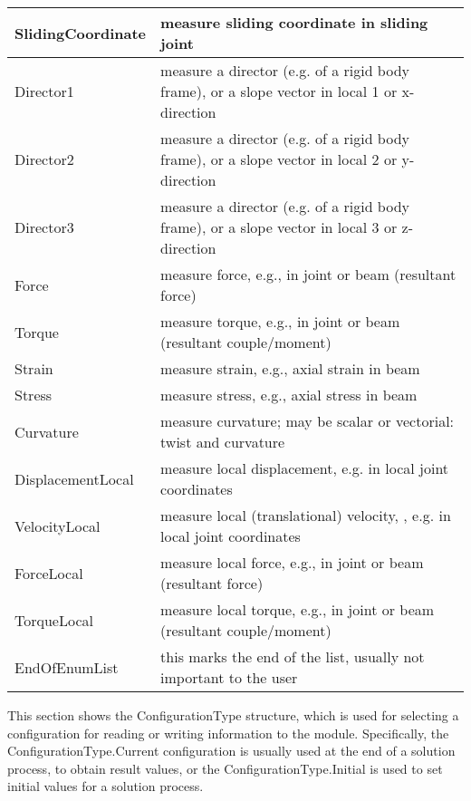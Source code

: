 \begin{center}
\begin{longtable}{| p{8cm} | p{8cm} |}
  SlidingCoordinate & measure sliding coordinate in sliding joint\\ \hline 
  Director1 & measure a director (e.g. of a rigid body frame), or a slope vector in local 1 or x-direction\\ \hline 
  Director2 & measure a director (e.g. of a rigid body frame), or a slope vector in local 2 or y-direction\\ \hline 
  Director3 & measure a director (e.g. of a rigid body frame), or a slope vector in local 3 or z-direction\\ \hline 
  Force & measure force, e.g., in joint or beam (resultant force)\\ \hline 
  Torque & measure torque, e.g., in joint or beam (resultant couple/moment)\\ \hline 
  Strain & measure strain, e.g., axial strain in beam\\ \hline 
  Stress & measure stress, e.g., axial stress in beam\\ \hline 
  Curvature & measure curvature; may be scalar or vectorial: twist and curvature\\ \hline 
  DisplacementLocal & measure local displacement, e.g. in local joint coordinates\\ \hline 
  VelocityLocal & measure local (translational) velocity, , e.g. in local joint coordinates\\ \hline 
  ForceLocal & measure local force, e.g., in joint or beam (resultant force)\\ \hline 
  TorqueLocal & measure local torque, e.g., in joint or beam (resultant couple/moment)\\ \hline 
  EndOfEnumList & this marks the end of the list, usually not important to the user\\ \hline 
\end{longtable}
\end{center}

This section shows the ConfigurationType structure, which is used for selecting a configuration for reading or writing information to the module. Specifically, the ConfigurationType.Current configuration is usually used at the end of a solution process, to obtain result values, or the ConfigurationType.Initial is used to set initial values for a solution process.




